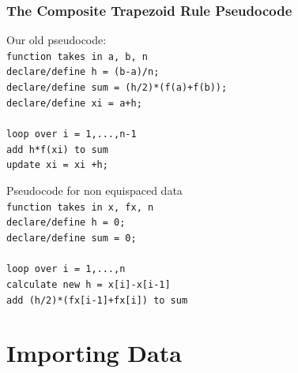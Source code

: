 \documentclass{if-beamer}
\begin{document}
\begin{frame}
	\frametitle{The Composite Trapezoid Rule Pseudocode}
		
	\begin{minipage}[t]{0.5\textwidth}
	Our old pseudocode:\\
	\vspace{10pt}
	\texttt{function takes in a, b, n}\\
	\texttt{declare/define h = (b-a)/n;}\\
	\texttt{declare/define sum = (h/2)*(f(a)+f(b)); }\\
	\texttt{declare/define xi = a+h;}\\
	\texttt{ }\\
	\texttt{loop over i = 1,...,n-1 }\\
	\texttt{\qquad add h*f(xi) to sum} \\
	\texttt{\qquad update xi = xi +h;}\\
	\end{minipage}
	\vspace{10pt}
	\begin{minipage}[t]{0.5\textwidth}
	Pseudocode for non equispaced data\\
	\vspace{10pt}
	\texttt{function takes in x, fx, n}\\
	\texttt{declare/define h = 0;}\\
	\texttt{declare/define sum = 0; }\\
	\texttt{ }\\
	\texttt{loop over i = 1,...,n }\\
	\texttt{\qquad calculate new h = x[i]-x[i-1]}\\
	\texttt{\qquad add (h/2)*(fx[i-1]+fx[i]) to sum} \\
	\end{minipage}	
	

	
\end{frame}	

\section{Importing Data}
\end{document}
